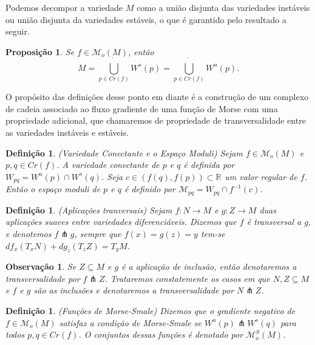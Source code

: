 \documentclass[12pt]{book}
\newtheorem{definicao}[teorema]{Definição}
\newtheorem{observacao}[teorema]{Observação}
\newtheorem{proposicao}[teorema]{Proposição}
\newcommand{\espacomoduli}[2]{\mathcal{M}_{#1#2}}
\newcommand{\espacotangenteponto}[2]{T_{#1}#2}
\newcommand{\funcoesmorse}[1]{\mathcal{M}_{o}(#1)}
\newcommand{\funcoesmorsesmale}[1]{\mathcal{M}^{S}_{o}(#1)}
\newcommand{\pontoscriticos}[1]{\textit{Cr}(#1)}
\newcommand{\real}[1]{\mathbb{R}^{#1}}
\newcommand{\reta}{\real{}}
\newcommand{\variedadeconectantepontos}[2]{W_{#1#2}}
\newcommand{\variedadeestavel}[1]{W^{s}(#1)}
\newcommand{\variedadeinstavel}[1]{W^{u}(#1)}
\begin{document}
	Podemos decompor a variedade $M$ como a união disjunta das variedades instáveis ou união disjunta da variedades estáveis, o que é garantido pelo resultado a seguir.
	
	\begin{proposicao}\label{proposicao_uniao_variedade_instavel_estavel}
		Se $f \in \funcoesmorse{M}$, então
		$$
		M = \dot{\bigcup_{p \in \pontoscriticos{f}}}\variedadeestavel{p} = \dot{\bigcup_{p \in \pontoscriticos{f}}}\variedadeinstavel{p}.
		$$
	\end{proposicao}

	 O propósito das definições desse ponto em diante é a construção de um complexo de cadeia associado ao fluxo gradiente de uma função de Morse com uma propriedade adicional, que chamaremos de propriedade de transversalidade entre as variedades instáveis e estáveis.
	 
	 \begin{definicao}
	 	(Variedade Conectante e o Espaço Moduli) Sejam $f \in \funcoesmorse{M}$ e $p,q \in \pontoscriticos{f}$. A variedade conectante de $p$ e $q$ é definida por $\variedadeconectantepontos{p}{q} = \variedadeinstavel{p}\cap \variedadeestavel{q}$. Seja $c \in (f(q), f(p)) \subset \reta$ um valor regular de $f$. Então o espaço moduli de $p$ e $q$ é definido por $\espacomoduli{p}{q} = \variedadeconectantepontos{p}{q}\cap f^{-1}(c)$.
	 \end{definicao}
	 
	 \begin{definicao}\label{definicao_aplicao_transversal}
	 	(Aplicações tranversais) Sejam $f: N\to M$ e $g: Z \to M$ duas aplicações suaves entre variedades diferenciáveis. Dizemos que $f$ é transversal a $g$, e denotemos $f \pitchfork g$, sempre que $f(x) = g(z) = y$ tem-se $df_{x}(\espacotangenteponto{x}{N}) + dg_{z}(\espacotangenteponto{z}{Z}) = \espacotangenteponto{y}{M} $.
	 \end{definicao}
	 
	 \begin{observacao}
	 	Se $Z \subseteq M$ e $g$ é a aplicação de inclusão, então denotaremos a transversalidade por $f\pitchfork Z$. Trataremos constatemente os casos em que $N, Z \subseteq M$ e $f$ e $g$ são as inclusões e denotaremos a transversalidade por $N \pitchfork Z$.
	 \end{observacao}
	 
	 \begin{definicao}
	 	(Funções de Morse-Smale) Dizemos que o gradiente negativo de $f \in \funcoesmorse{M}$ satisfaz a condição de Morse-Smale se $\variedadeinstavel{p}\pitchfork \variedadeestavel{q}$ para todos $p,q \in \pontoscriticos{f}$. O conjuntos dessas funções é denotado por $\funcoesmorsesmale{M}$.
	 \end{definicao}
	 
\end{document}
